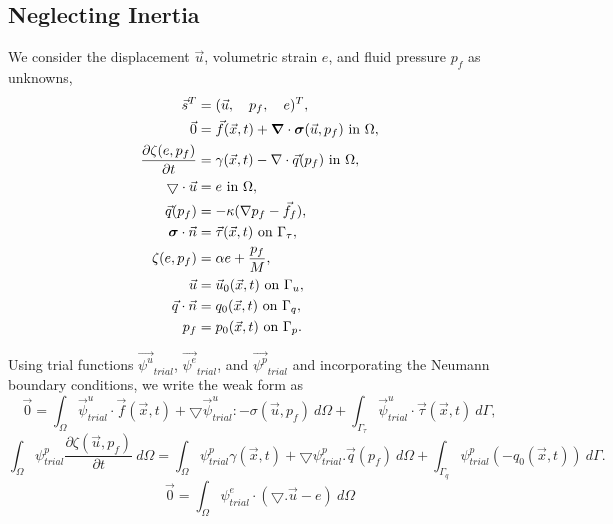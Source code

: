 \subsection{Neglecting Inertia}

We consider the displacement $\vec{u}$, volumetric strain $e$, and fluid pressure $p_f$ as unknowns,
\begin{align}
  \vec{s}^T &= (\vec{u}, \quad p_f, \quad e)^T, \\
%
  \vec{0} &= \vec{f}(\vec{x},t) + \tensor{\nabla} \cdot \tensor{\sigma}(\vec{u},p_f) 
\text{ in }\Omega, \\
%
  \frac{\partial \zeta(e,p_f)}{\partial t} &= \gamma(\vec{x},t) - \nabla \cdot \vec{q}
(p_f) \text{ in }
\Omega, \\
%
\bigtriangledown \cdot \vec{u} &= e \text{ in } \Omega, \\
%
  \vec{q}(p_f) &= -\kappa (\nabla p_f - \vec{f}_f), \\
%
  \tensor{\sigma} \cdot \vec{n} &= \vec{\tau}(\vec{x},t) \text{ on }\Gamma_\tau, \\
%
  \zeta(e,p_f) &= \alpha e + \frac{p_f}{M}, \\
%
  \vec{u} &= \vec{u}_0(\vec{x},t) \text{ on }\Gamma_u, \\
%
  \vec{q} \cdot \vec{n} &= q_0(\vec{x},t) \text{ on }\Gamma_q, \\
%
  p_f &= p_0(\vec{x},t) \text{ on }\Gamma_p.
\end{align}

Using trial functions $\vec{\psi^u}_{trial}$, $\vec{\psi^e}_{trial}$, and $\vec{\psi^p}_{trial}$ and incorporating the Neumann boundary conditions, we write the weak form as \\
\begin{equation}
\vec{0} = \int_{\Omega} \vec{\psi}_{trial}^u \cdot \vec{f}(\vec{x},t) + 
\bigtriangledown \vec{\psi}_{trial}^u : -\sigma(\vec{u},p_f) \ d\Omega + 
\int_{\Gamma_{\tau}} \vec{\psi}_{trial}^u \cdot \vec{\tau}(\vec{x},t) \ d\Gamma,
\end{equation}
\begin{equation}
\int_{\Omega} \psi_{trial}^p \frac{\partial \zeta (\vec{u},p_f)}{\partial t} \ d\Omega = \int_{\Omega} \psi_{trial}^p \gamma(\vec{x},t) + \bigtriangledown \psi_{trial}^p . \vec{q}(p_f) \ d\Omega + \int_{\Gamma_q} \psi_{trial}^p (-q_0(\vec{x},t)) \ d\Gamma.
\end{equation}
\begin{equation}
\vec{0} = \int_{\Omega} \psi_{trial}^e \cdot (\bigtriangledown . \vec{u} - e) \ 
d\Omega
\end{equation} \\

